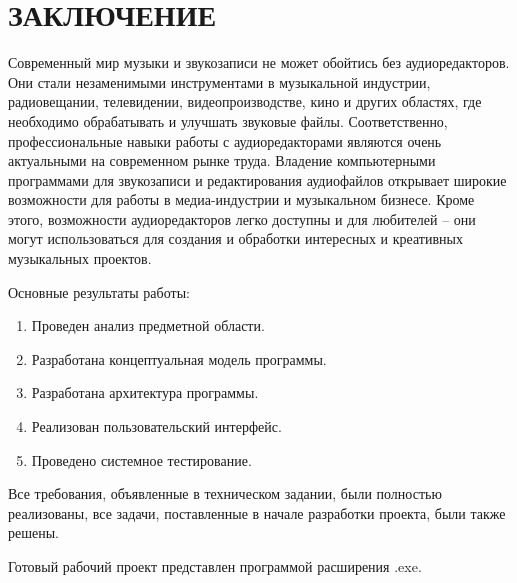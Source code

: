 \section*{ЗАКЛЮЧЕНИЕ}

Современный мир музыки и звукозаписи не может обойтись без аудиоредакторов. Они стали незаменимыми инструментами в музыкальной индустрии, радиовещании, телевидении, видеопроизводстве, кино и других областях, где необходимо обрабатывать и улучшать звуковые файлы. Соответственно, профессиональные навыки работы с аудиоредакторами являются очень актуальными на современном рынке труда. Владение компьютерными программами для звукозаписи и редактирования аудиофайлов открывает широкие возможности для работы в медиа-индустрии и музыкальном бизнесе. Кроме этого, возможности аудиоредакторов легко доступны и для любителей – они могут использоваться для создания и обработки интересных и креативных музыкальных проектов.


Основные результаты работы:

\begin{enumerate}
\item Проведен анализ предметной области.
\item Разработана концептуальная модель программы.
\item Разработана архитектура программы.
\item Реализован пользовательский интерфейс.
\item Проведено системное тестирование.
\end{enumerate}

Все требования, объявленные в техническом задании, были полностью реализованы, все задачи, поставленные в начале разработки проекта, были также решены.

Готовый рабочий проект представлен программой расширения .exe.
